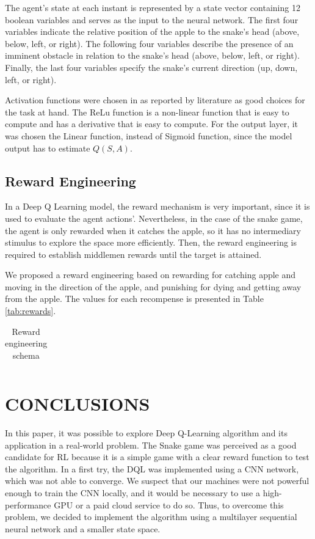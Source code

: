 \documentclass[conference]{IEEEtran}
\begin{document}
The agent's state at each instant is represented by a state vector containing 12 boolean variables and serves as the input to the neural network. The first four variables indicate the relative position of the apple to the snake's head (above, below, left, or right). The following four variables describe the presence of an imminent obstacle in relation to the snake's head (above, below, left, or right). Finally, the last four variables specify the snake's current direction (up, down, left, or right). 

Activation functions were chosen in as reported by literature as good choices for the task at hand. The ReLu function is a non-linear function that is easy to compute and has a derivative that is easy to compute. For the output layer, it was chosen the Linear function, instead of Sigmoid function, since the model output has to estimate $Q(S,A)$.


\subsection{Reward Engineering}

In a Deep Q Learning model, the reward mechanism is very important, since it is used to evaluate the agent actions'. Nevertheless, in the case of the snake game, the agent is only rewarded when it catches the apple, so it has no intermediary stimulus to explore the space more efficiently. Then, the reward engineering is required to establish middlemen rewards until the target is attained.

We proposed a reward engineering based on rewarding for catching apple and moving in the direction of the apple, and punishing for dying and getting away from the apple. The values for each recompense is presented in Table \ref{tab:rewards}.

\begin{table}[h]
    \centering
    \label{tab:NNarchtecture}
    \caption{Reward engineering schema}
    \begin{tabular}{cc} 
        \toprule %

    \end{tabular}
\end{table}


\section{CONCLUSIONS}

In this paper, it was possible to explore Deep Q-Learning algorithm and its application in a real-world problem. The Snake game was perceived as a good candidate for RL because it is a simple game with a clear reward function to test the algorithm. In a first try, the DQL was implemented using a CNN network, which was not able to converge. We suspect that our machines were not powerful enough to train the CNN locally, and it would be necessary to use a high-performance GPU or a paid cloud service to do so. Thus, to overcome this problem, we decided to implement the algorithm using a multilayer sequential neural network and a smaller state space.
\end{document}
